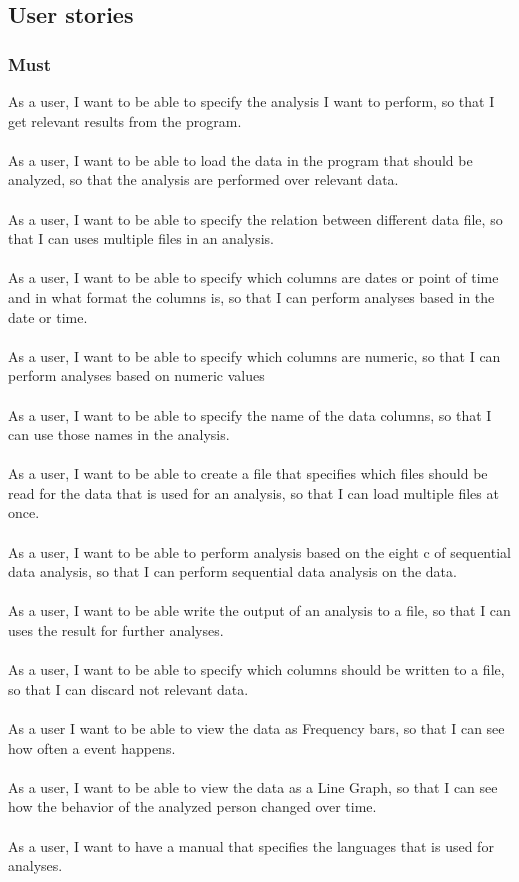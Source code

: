 \subsection{User stories}
\subsubsection{Must}
As a user, I want to be able to specify the analysis I want to perform, so that I get relevant results from the program. 
\\\\
As a user, I want to be able to load the data in the program that should be analyzed, so that the analysis are performed over relevant data. 
\\\\
As a user, I want to be able to specify the relation between different data file, so that I can uses multiple files in an analysis.
\\\\
As a user, I want to be able to specify which columns are dates or point of time and in what format the columns is, so that I can perform analyses based in the date or time.
\\\\
As a user, I want to be able to specify which columns are numeric, so that I can perform analyses based on numeric values
\\\\
As a user, I want to be able to specify the name of the data columns, so that I can use those names in the analysis.
\\\\
As a user, I want to be able to create a file that specifies which files should be read for the data that is used for an analysis, so that I can load multiple files at once.
\\\\
As a user, I want to be able to perform analysis based on the eight c of sequential data analysis, so that I can perform sequential data analysis on the data.
\\\\
As a user, I want to be able write the output of an analysis to a file, so that I can uses the result for further analyses.
\\\\
As a user, I want to be able to specify which columns should be written to a file, so that I can discard not relevant data.
\\\\
As a user I want to be able to view the data as Frequency bars, so that I can see how often a event happens.
\\\\
As a user, I want to be able to view the data as a Line Graph, so that I can see how the behavior of the analyzed person changed over time.
\\\\
As a user, I want to have a manual that specifies the languages that is used for analyses.

